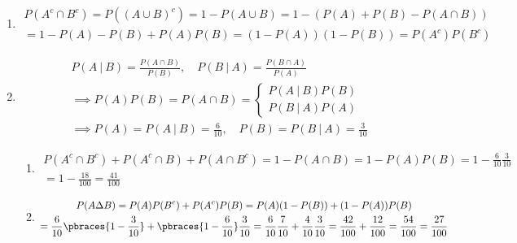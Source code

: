 \begin{solution}

\phantom{}

\begin{enumerate}[label = (\alph*)]

    \item

    \begin{multline*}
        P(A^c \cap B^c)
        =
        P((A \cup B)^c)
        =
        1 - P(A \cup B)
        =
        1 - (P(A) + P(B) - P(A \cap B)) \\
        =
        1 - P(A) - P(B) + P(A) P(B)
        =
        (1 - P(A)) (1 - P(B))
        =
        P(A^c) P(B^c)
    \end{multline*}

    \item

    \begin{align*}
        &
        P(A ~|~ B) = \frac{P(A \cap B)}{P(B)},
        \quad
        P(B ~|~ A) = \frac{P(B \cap A)}{P(A)} \\
        & \implies
        P(A) P(B)
        =
        P(A \cap B)
        =
        \begin{cases}
            P(A ~|~ B) P(B) \\
            P(B ~|~ A) P(A)
        \end{cases} \\
        & \implies
        P(A) = P(A ~|~ B) = \frac{6}{10},
        \quad
        P(B) = P(B ~|~ A) = \frac{3}{10}
    \end{align*}

    \begin{enumerate}[label = (\roman*)]

        \item

        \begin{multline*}
            P(A^c \cap B^c) + P(A^c \cap B) + P(A \cap B^c)
            =
            1 - P(A \cap B)
            =
            1 - P(A) P(B)
            =
            1 - \frac{6}{10} \frac{3}{10} \\
            =
            1 - \frac{18}{100}
            =
            \frac{41}{100}
        \end{multline*}

        \item

        \begin{multline*}
            P(A \Delta B)
            =
            P(A) P(B^c) + P(A^c) P(B)
            =
            P(A) (1 - P(B)) + (1 - P(A)) P(B) \\
            =
            \frac{6}{10} \pbraces{1 - \frac{3}{10}} + \pbraces{1 - \frac{6}{10}} \frac{3}{10}
            =
            \frac{6}{10} \frac{7}{10} + \frac{4}{10} \frac{3}{10}
            =
            \frac{42}{100} + \frac{12}{100}
            =
            \frac{54}{100}
            =
            \frac{27}{100}
        \end{multline*}


\end{enumerate}
\end{enumerate}
\end{solution}

